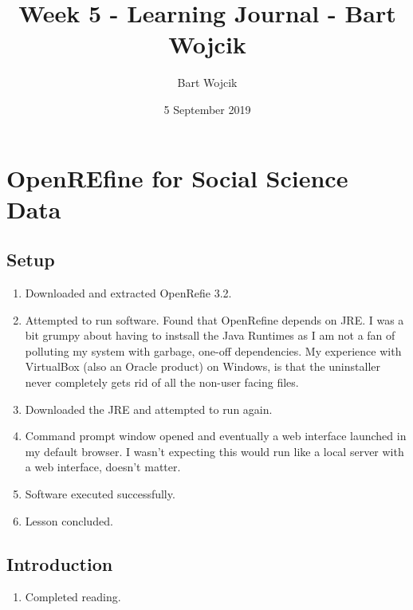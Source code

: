 \documentclass{article}
\title{Week 5 - Learning Journal   - Bart Wojcik}
\author{Bart Wojcik}
\date{5 September 2019}
\begin{document}
\maketitle

\section{OpenREfine for Social Science Data}
\subsection{Setup}
\begin{enumerate}
    \item Downloaded and extracted OpenRefie 3.2.
    \item Attempted to run software. Found that OpenRefine depends on JRE. I was a bit grumpy about having to instsall the Java Runtimes as I am not a fan of polluting my system with garbage, one-off dependencies. My experience with VirtualBox (also an Oracle product) on Windows, is that the uninstaller never completely gets rid of all the non-user facing files.
    \item Downloaded the JRE and attempted to run again.
    \item Command prompt window opened and eventually a web interface launched in my default browser. I wasn't expecting this would run like a local server with a web interface, doesn't matter.
    \item Software executed successfully.
    \item Lesson concluded.
\end{enumerate}
\subsection{Introduction}
\begin{enumerate}
    \item Completed reading.
\end{enumerate}
\end{document}
